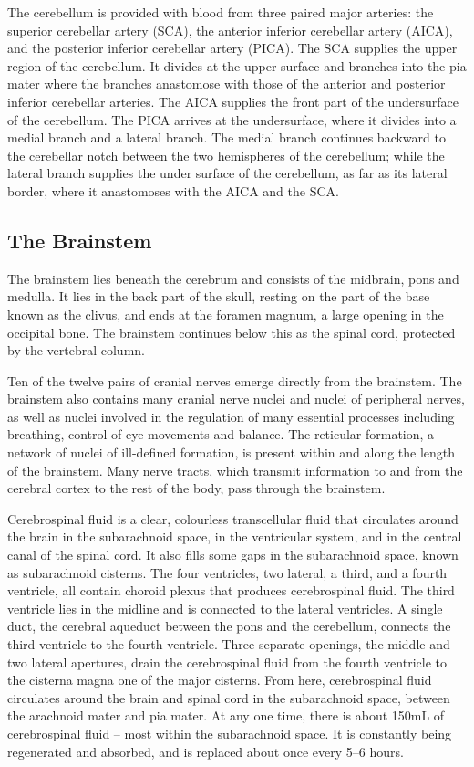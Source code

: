 The cerebellum is provided with blood from three paired major arteries: the superior cerebellar artery (SCA), the anterior inferior cerebellar artery (AICA), and the posterior inferior cerebellar artery (PICA). The SCA supplies the upper region of the cerebellum. It divides at the upper surface and branches into the pia mater where the branches anastomose with those of the anterior and posterior inferior cerebellar arteries. The AICA supplies the front part of the undersurface of the cerebellum. The PICA arrives at the undersurface, where it divides into a medial branch and a lateral branch. The medial branch continues backward to the cerebellar notch between the two hemispheres of the cerebellum; while the lateral branch supplies the under surface of the cerebellum, as far as its lateral border, where it anastomoses with the AICA and the SCA.

\hypertarget{the-brainstem}{%
\subsection{The Brainstem}\label{the-brainstem}}

The brainstem lies beneath the cerebrum and consists of the midbrain, pons and medulla. It lies in the back part of the skull, resting on the part of the base known as the clivus, and ends at the foramen magnum, a large opening in the occipital bone. The brainstem continues below this as the spinal cord, protected by the vertebral column.

Ten of the twelve pairs of cranial nerves emerge directly from the brainstem. The brainstem also contains many cranial nerve nuclei and nuclei of peripheral nerves, as well as nuclei involved in the regulation of many essential processes including breathing, control of eye movements and balance. The reticular formation, a network of nuclei of ill-defined formation, is present within and along the length of the brainstem. Many nerve tracts, which transmit information to and from the cerebral cortex to the rest of the body, pass through the brainstem.

Cerebrospinal fluid is a clear, colourless transcellular fluid that circulates around the brain in the subarachnoid space, in the ventricular system, and in the central canal of the spinal cord. It also fills some gaps in the subarachnoid space, known as subarachnoid cisterns. The four ventricles, two lateral, a third, and a fourth ventricle, all contain choroid plexus that produces cerebrospinal fluid. The third ventricle lies in the midline and is connected to the lateral ventricles. A single duct, the cerebral aqueduct between the pons and the cerebellum, connects the third ventricle to the fourth ventricle. Three separate openings, the middle and two lateral apertures, drain the cerebrospinal fluid from the fourth ventricle to the cisterna magna one of the major cisterns. From here, cerebrospinal fluid circulates around the brain and spinal cord in the subarachnoid space, between the arachnoid mater and pia mater. At any one time, there is about 150mL of cerebrospinal fluid -- most within the subarachnoid space. It is constantly being regenerated and absorbed, and is replaced about once every 5--6 hours.

